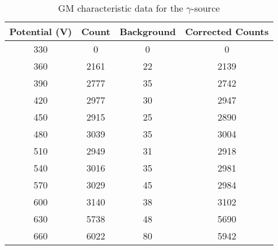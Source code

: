 \begin{table}[H]
    \centering
    \begin{tabular}{|c|c|c|c|}\hline
    Potential (V) & Count & Background & Corrected Counts \\ \hline
    330 & 0 & 0 & 0 \\
    360 & 2161 & 22 & 2139 \\
    390 & 2777 & 35 & 2742 \\
    420 & 2977 & 30 & 2947 \\
    450 & 2915 & 25 & 2890 \\
    480 & 3039 & 35 & 3004 \\
    510 & 2949 & 31 & 2918 \\
    540 & 3016 & 35 & 2981 \\
    570 & 3029 & 45 & 2984 \\
    600 & 3140 & 38 & 3102 \\
    630 & 5738 & 48 & 5690 \\
    660 & 6022 & 80 & 5942 \\\hline
    \end{tabular}
    \caption{GM characteristic data for the $\gamma$-source}
    \label{t2}
\end{table}